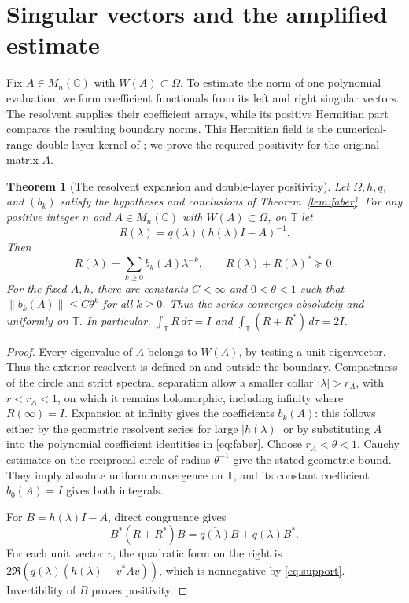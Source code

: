\documentclass[11pt]{article}
\newcommand{\C}{\mathbb C}
\newcommand{\T}{\mathbb T}
\newtheorem{theorem}{Theorem}[section]
\theoremstyle{remark}\newtheorem{remark}[theorem]{Remark}
\numberwithin{equation}{section}
\begin{document}
\section{Singular vectors and the amplified estimate}\label{sec:matrix}
Fix $A\in M_n(\C)$ with $W(A)\subset\Omega$.
To estimate the norm of one polynomial evaluation, we form coefficient
functionals from its left and right singular vectors. The resolvent supplies
their coefficient arrays, while its positive Hermitian part compares the
resulting boundary norms. This Hermitian field is the numerical-range double-layer kernel of
\cite{DelyonDelyon1999,CrouzeixPalencia2017}; we prove the required
positivity for the original matrix $A$.

\begin{theorem}[The resolvent expansion and double-layer positivity]\label{lem:resolvent}
Let $\Omega,h,q$, and $(b_k)$ satisfy the hypotheses and conclusions of Theorem~\ref{lem:faber}. For any positive integer $n$ and $A\in M_n(\C)$ with $W(A)\subset\Omega$, on $\T$ let
\begin{equation}\label{eq:R}
 R(\lambda)=q(\lambda)(h(\lambda)I-A)^{-1}.
\end{equation}
Then
\[
 R(\lambda)=\sum_{k\ge0}b_k(A)\lambda^{-k},\qquad R(\lambda)+R(\lambda)^*\succeq0.
\]
For the fixed $A,h$, there are constants $C<\infty$ and $0<\theta<1$
such that $\|b_k(A)\|\le C\theta^k$ for all $k\ge0$. Thus the series
converges absolutely and uniformly on $\T$. In particular,
$\int_\T R\,d\tau=I$ and $\int_\T(R+R^*)\,d\tau=2I$.
\end{theorem}
\begin{proof}
Every eigenvalue of $A$ belongs to $W(A)$, by testing a unit eigenvector. Thus the exterior resolvent is defined on and outside the boundary. Compactness of the circle and strict spectral separation allow a smaller collar $|\lambda|>r_A$, with $r<r_A<1$, on which it remains holomorphic, including infinity where $R(\infty)=I$. Expansion at infinity gives the coefficients $b_k(A)$: this follows either by the geometric resolvent series for large $|h(\lambda)|$ or by substituting $A$ into the polynomial coefficient identities in \eqref{eq:faber}. Choose $r_A<\theta<1$. Cauchy estimates on the reciprocal circle of
radius $\theta^{-1}$ give the stated geometric bound. They imply
absolute uniform convergence on $\T$, and its constant coefficient
$b_0(A)=I$ gives both integrals.

For $B=h(\lambda)I-A$, direct congruence gives
\[
 B^*(R+R^*)B=\overline{q(\lambda)}B+q(\lambda)B^*.
\]
For each unit vector $v$, the quadratic form on the right is
$2\Re(\overline{q(\lambda)}(h(\lambda)-v^*Av))$, which is nonnegative by \eqref{eq:support}. Invertibility of $B$ proves positivity.
\end{proof}
\end{document}
